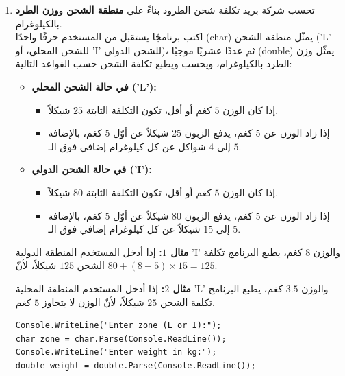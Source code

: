 \documentclass[14pt]{extarticle}
\begin{document}
\begin{enumerate}[resume, itemsep=2.2em]
\item
تحسب شركة بريد تكلفة شحن الطرود بناءً على \textbf{منطقة الشحن} و\textbf{وزن الطرد} بالكيلوغرام. \\
اكتب برنامجًا يستقبل من المستخدم حرفًا واحدًا (\textenglish{char}) يمثّل منطقة الشحن (\textenglish{'L'} للشحن المحلي، أو \textenglish{'I'} للشحن الدولي)، ثم عددًا عشريًا موجبًا (\textenglish{double}) يمثّل وزن الطرد بالكيلوغرام، ويحسب ويطبع تكلفة الشحن حسب القواعد التالية:
\begin{itemize}
    \item \textbf{في حالة الشحن المحلي (\textenglish{'L'}):}
    \begin{itemize}[nosep]
        \item إذا كان الوزن $5$ كغم أو أقل، تكون التكلفة الثابتة $25$ شيكلاً.
        \item إذا زاد الوزن عن $5$ كغم، يدفع الزبون $25$ شيكلاً عن أوّل $5$ كغم، بالإضافة إلى $4$ شواكل عن كل كيلوغرام إضافي فوق الـ $5$.
    \end{itemize}
    \item \textbf{في حالة الشحن الدولي (\textenglish{'I'}):}
    \begin{itemize}[nosep]
        \item إذا كان الوزن $5$ كغم أو أقل، تكون التكلفة الثابتة $80$ شيكلاً.
        \item إذا زاد الوزن عن $5$ كغم، يدفع الزبون $80$ شيكلاً عن أوّل $5$ كغم، بالإضافة إلى $15$ شيكلاً عن كل كيلوغرام إضافي فوق الـ $5$.
    \end{itemize}
\end{itemize}

\textbf{مثال $1$:} إذا أدخل المستخدم المنطقة الدولية \textenglish{'I'} والوزن $8$ كغم، يطبع البرنامج تكلفة الشحن $125$ شيكلاً، لأنّ $80 + (8 - 5) \times 15 = 125$.

\textbf{مثال $2$:} إذا أدخل المستخدم المنطقة المحلية \textenglish{'L'} والوزن $3.5$ كغم، يطبع البرنامج تكلفة الشحن $25$ شيكلاً، لأنّ الوزن لا يتجاوز $5$ كغم.

\ifwithsols
\begin{boxSolution}
\begin{english}
\begin{verbatim}
Console.WriteLine("Enter zone (L or I):");
char zone = char.Parse(Console.ReadLine());
Console.WriteLine("Enter weight in kg:");
double weight = double.Parse(Console.ReadLine());


\end{verbatim}
\end{english}
\end{boxSolution}
\end{enumerate}
\end{document}
